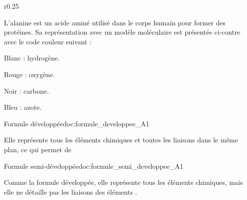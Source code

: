 \vspace*{8pt}
\begin{wrapfigure}[5]{r}{0.25\linewidth}
  \vspace*{-22pt}
\end{wrapfigure}

L'alanine est un acide aminé utilisé dans le corps humain pour former des protéines.
Sa représentation avec un modèle moléculaire est présentée ci-contre avec le code couleur suivant :
\begin{listePoints}
  \item Blanc : hydrogène.
  \item Rouge : oxygène.
  \item Noir : carbone.
  \item Bleu : azote.
\end{listePoints}



\newpage
\vspace*{-30pt}
\begin{doc}{Formule développée}{doc:formule_developpee_A1}
  \begin{encart}  
    Elle représente tous les éléments chimiques et toutes les liaisons dans le même plan, ce qui permet de 
  \end{encart}

  \exemples
  \vspace*{-18pt}
  \begin{center}
    \qq{}
  \end{center}
\end{doc}


\begin{doc}{Formule semi-développée}{doc:formule_semi_developpee_A1}
  \begin{encart}
    Comme la formule développée, elle représente tous les éléments chimiques, mais elle ne détaille pas les liaisons des éléments .
  \end{encart}

  \exemples
  \vspace*{-8pt}
  \begin{center}
    \qq{}
  \end{center}
\end{doc}

